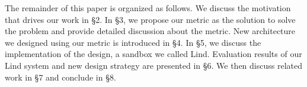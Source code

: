 The remainder of this paper is organized as follows. 
We discuss the motivation that drives our work in \S{2}. 
In \S{3}, we propose our metric as the solution to solve the problem and provide detailed discussion about the metric.
New architecture we designed using our metric is introduced in \S{4}. In \S{5}, we discuss the implementation of the design, a sandbox we called Lind. 
Evaluation results of our Lind system and new design strategy are presented in \S{6}. 
We then discuss related work in \S{7} and conclude in \S{8}. 